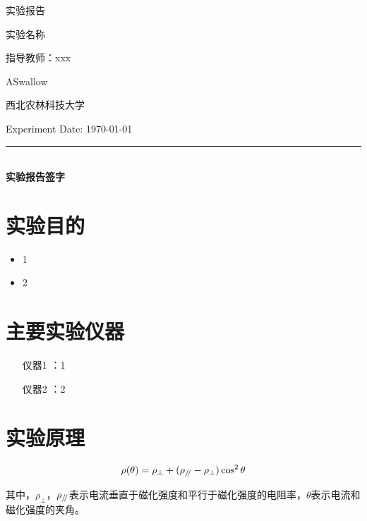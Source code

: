 \documentclass[12pt,a4paper]{article}
\renewcommand{\parallel}{\mathrel{/ \mskip-4mu /}}
\begin{document}
	
	\begin{titlepage}
		\centering
		{\Huge 实验报告}\par\vspace{1.5cm}
		{\Large 实验名称}\par\vspace{1cm}
		{\large 指导教师：xxx}\par\vspace{0.5cm}
		{\large ASwallow}\par\vspace{0.5cm}
		{\large 西北农林科技大学}\par\vspace{5cm}
		
		\large Experiment Date: \hspace{4cm} \today\par\vspace{0.5cm} %
		\rule{10cm}{0.4pt} \\
		\textbf{实验报告签字} 
	\end{titlepage}
	
	\tableofcontents
	\newpage
	
	\section{实验目的}
	\begin{itemize}
		\item 1
		\item 2
	\end{itemize}
	
	\section{主要实验仪器}
	\begin{itemize}
		\item [仪器1]：1
		\item [仪器2]：2
	\end{itemize}
	
	\section{实验原理}
	
	
	\begin{equation}
		\rho(\theta)=\rho_\perp+(\rho_{\parallel}-\rho_\perp )\cos^2\theta
	\end{equation}
	
	其中，\(\rho_\perp\)，\(\rho_{\parallel}\)表示电流垂直于磁化强度和平行于磁化强度的电阻率，\(\theta\)表示电流和磁化强度的夹角。
	
\end{document}
